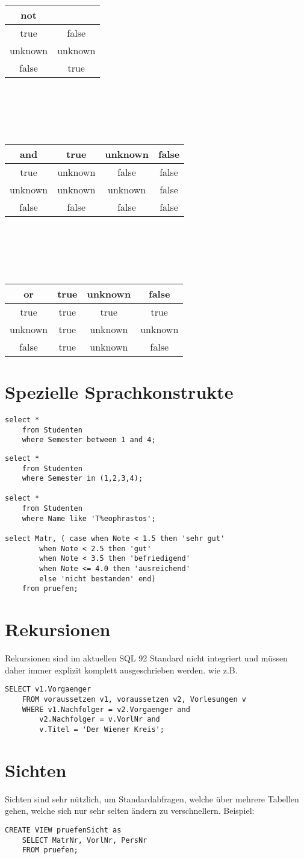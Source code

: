 \begin{tabular}{c|c}
\textbf{not}  &  \\ 
\hline true & false \\ 
unknown & unknown \\ 
 false & true \\ 
\end{tabular} 
\\\qquad\\
\\\qquad\\
\begin{tabular}{c|c|c|c}
\textbf{and}  & true & unknown & false \\ 
\hline true & unknown & false & false \\ 
unknown & unknown & unknown & false \\ 
 false & false & false & false \\ 
\end{tabular} 
\\\qquad\\
\\\qquad\\
\begin{tabular}{c|c|c|c}
 \textbf{or} & true & unknown & false \\ 
\hline true & true & true & true \\ 
 unknown & true & unknown & unknown \\ 
 false & true & unknown & false \\ 
\end{tabular} 
\section{Spezielle Sprachkonstrukte}
\begin{lstlisting}
select *
	from Studenten
	where Semester between 1 and 4;
\end{lstlisting}
\newpage
\begin{lstlisting}
select *
	from Studenten
	where Semester in (1,2,3,4);

select *
	from Studenten
	where Name like 'T%eophrastos';

select Matr, ( case when Note < 1.5 then 'sehr gut'
		when Note < 2.5 then 'gut'
		when Note < 3.5 then 'befriedigend'
		when Note <= 4.0 then 'ausreichend'
		else 'nicht bestanden' end)
	from pruefen;
\end{lstlisting}
\section{Rekursionen}
Rekursionen sind im aktuellen SQL 92 Standard nicht integriert und müssen daher immer explizit komplett ausgeschrieben werden. wie z.B.
\begin{lstlisting}
SELECT v1.Vorgaenger
	FROM voraussetzen v1, voraussetzen v2, Vorlesungen v
	WHERE v1.Nachfolger = v2.Vorgaenger and
		v2.Nachfolger = v.VorlNr and
		v.Titel = 'Der Wiener Kreis';
\end{lstlisting}
\section{Sichten}
Sichten sind sehr nützlich, um Standardabfragen, welche über mehrere Tabellen gehen, welche sich nur sehr selten ändern zu verschnellern. Beispiel:
\begin{lstlisting}
CREATE VIEW pruefenSicht as
	SELECT MatrNr, VorlNr, PersNr
	FROM pruefen;
\end{lstlisting}